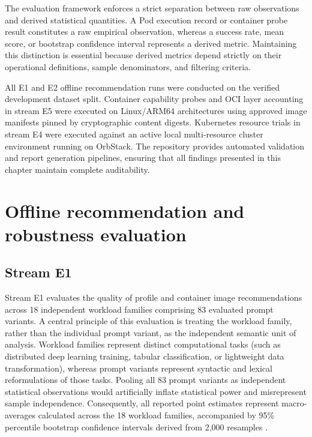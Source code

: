 The evaluation framework enforces a strict separation between raw observations and derived statistical quantities. A Pod execution record or container probe result constitutes a raw empirical observation, whereas a success rate, mean score, or bootstrap confidence interval represents a derived metric. Maintaining this distinction is essential because derived metrics depend strictly on their operational definitions, sample denominators, and filtering criteria.

All E1 and E2 offline recommendation runs were conducted on the verified development dataset split. Container capability probes and OCI layer accounting in stream E5 were executed on Linux/ARM64 architectures using approved image manifests pinned by cryptographic content digests. Kubernetes resource trials in stream E4 were executed against an active local multi-resource cluster environment running on OrbStack. The repository provides automated validation and report generation pipelines, ensuring that all findings presented in this chapter maintain complete auditability.

\section{Offline recommendation and robustness evaluation}
\label{sec:offline_recommendation}

\subsection{Stream E1}
\label{subsec:e1_recommendation_quality}

Stream E1 evaluates the quality of profile and container image recommendations across 18 independent workload families comprising 83 evaluated prompt variants. A central principle of this evaluation is treating the workload family, rather than the individual prompt variant, as the independent semantic unit of analysis. Workload families represent distinct computational tasks (such as distributed deep learning training, tabular classification, or lightweight data transformation), whereas prompt variants represent syntactic and lexical reformulations of those tasks. Pooling all 83 prompt variants as independent statistical observations would artificially inflate statistical power and misrepresent sample independence. Consequently, all reported point estimates represent macro-averages calculated across the 18 workload families, accompanied by 95\% percentile bootstrap confidence intervals derived from 2,000 resamples \cite{bootstrap}.

